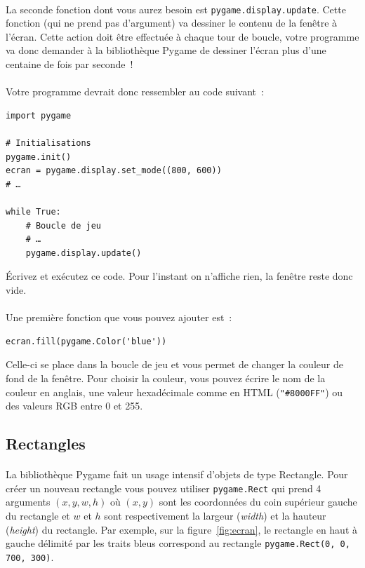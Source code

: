 \paragraph{}
La seconde fonction dont vous aurez besoin est \texttt{pygame.display.update}.
Cette fonction (qui ne prend pas d'argument) va dessiner le contenu de la fenêtre à l'écran.
Cette action doit être effectuée à chaque tour de boucle, votre programme va donc demander à la bibliothèque Pygame de dessiner l'écran plus d'une centaine de fois par seconde~!

\paragraph{}
Votre programme devrait donc ressembler au code suivant~:
\begin{verbatim}
import pygame

# Initialisations
pygame.init()
ecran = pygame.display.set_mode((800, 600))
# …

while True:
    # Boucle de jeu
    # …
    pygame.display.update()
\end{verbatim}
Écrivez et exécutez ce code.
Pour l'instant on n'affiche rien, la fenêtre reste donc vide.

\paragraph{}
Une première fonction que vous pouvez ajouter est~:
\begin{verbatim}
ecran.fill(pygame.Color('blue'))
\end{verbatim}
Celle-ci se place dans la boucle de jeu et vous permet de changer la couleur de fond de la fenêtre.
Pour choisir la couleur, vous pouvez écrire le nom de la couleur en anglais, une valeur hexadécimale comme en HTML (\texttt{"\#8000FF"}) ou des valeurs RGB entre 0 et 255.

\subsection{Rectangles}
\label{sec:rectangles}

\paragraph{}
La bibliothèque Pygame fait un usage intensif d'objets de type Rectangle.
Pour créer un nouveau rectangle vous pouvez utiliser \texttt{pygame.Rect} qui prend 4 arguments \((x, y, w, h)\) où \((x,y)\) sont les coordonnées du coin supérieur gauche du rectangle et \(w\) et \(h\) sont respectivement la largeur (\emph{width}) et la hauteur (\emph{height}) du rectangle.
Par exemple, sur la figure~\ref{fig:ecran}, le rectangle en haut à gauche délimité par les traits bleus correspond au rectangle \texttt{pygame.Rect(0, 0, 700, 300)}.

